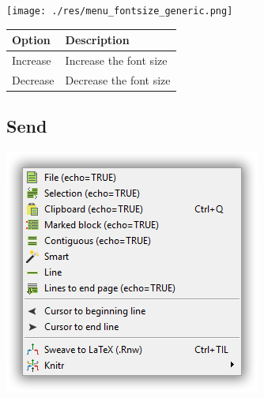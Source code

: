 \texttt{[image: ./res/menu\_fontsize\_generic.png]}\\

\begin{scriptsize}\begin{tabularx}{\textwidth}{>{\hsize=0.3\hsize}X>{\hsize=0.7\hsize}X}\\
    \hline
    \textbf{Option} & \textbf{Description} \\
    \hline
    Increase & Increase the font size \\
    Decrease & Decrease the font size \\
    \hline
  \end{tabularx}\end{scriptsize}


\hypertarget{menu_r_send}{}
\subsection{Send}

\includegraphics[scale=0.50]{./res/menu_r_send.png}\\

